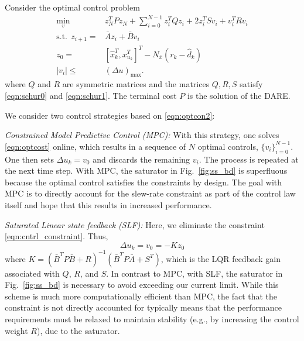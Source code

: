 \documentclass[twocolumn,twoside]{IEEEtran}
\newcommand{\Ad}{\ensuremath{\bar A }\xspace}
\newcommand{\Bd}{\ensuremath{\bar B }\xspace}
\begin{document}
Consider the optimal control problem
\begin{subequations}
\begin{align}
\min_{v}\:\:& z^T_{N}Pz_{N} + \sum_{i=0}^{N-1}z_{i}^{T}Qz_{i} + 2z^T_iSv_i + v^{T}_{i}Rv_{i} \label{eqn:optcost}\\
  \text{s.t.}\:\:  z_{i+1} =& \Ad z_{i} + \Bd v_{i}\\
z_{0} =& [\hat{x}^T_{k}, x^T_{u_k}]^T - N_{\bar{x}}(r_k-\hat{d}_k)\\
|v_i | \leq& (\Delta u)_{\text{max}}.\label{eqn:cntrl_constraint}
\end{align}\label{eqn:optcon2}%
\end{subequations}
where $Q$ and $R$ are symmetric matrices and the matrices $Q,R,S$ satisfy \eqref{eqn:schur0} and \eqref{eqn:schur1}.
The terminal cost $P$ is the solution of the DARE. 

We consider two control strategies based on \eqref{eqn:optcon2}:
\par\noindent\emph{Constrained Model Predictive Control (MPC):} With this strategy, one solves \eqref{eqn:optcost} online, which results in a sequence of $N$ optimal controls, $\{v_i\}_{i=0}^{N-1}$.
One then sets $\Delta u_k = v_0$ and discards the remaining $v_i$. The process is repeated at the next time step. With MPC, the saturator in Fig.~\ref{fig:ss_bd} is superfluous because the optimal control satisfies the constraints by design. The goal with MPC is to directly account for the slew-rate constraint as part of the control law itself and hope that this results in increased performance.
\par\noindent\emph{Saturated Linear state feedback (SLF):}
Here, we eliminate the constraint \eqref{eqn:cntrl_constraint}. Thus,
\begin{equation*}
  \Delta u_k =v_0 = -Kz_0 %
\end{equation*}
where $K = (\Bd^TP\Bd + R)^{-1}(\Bd^TP\Ad + S^T)$,
which is the LQR feedback gain associated with $Q$, $R$, and $S$. 
In contrast to MPC, with SLF, the saturator in Fig.~\ref{fig:ss_bd} is necessary to avoid exceeding our current limit. While this scheme is much more computationally efficient than MPC, the fact that the constraint is not directly accounted for typically means that the performance requirements must be relaxed to maintain stability (e.g., by increasing the control weight $R$), due to the saturator.
\end{document}
